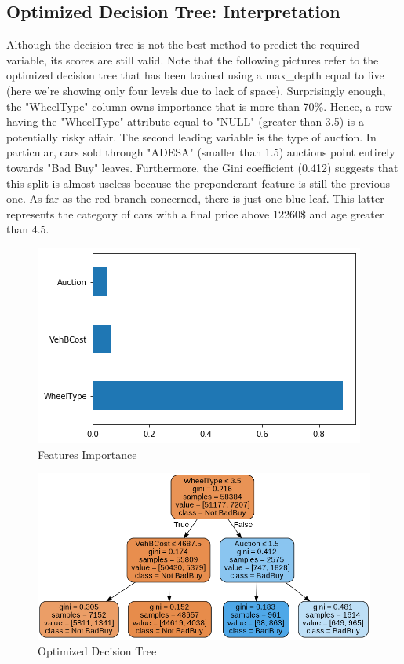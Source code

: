 \documentclass{article}
\begin{document}
	\subsection{Optimized Decision Tree: Interpretation}
	Although the decision tree is not the best method to predict the required variable, its scores are still valid. Note that the following pictures refer to the optimized decision tree that has been trained using a max\_depth equal to five (here we're showing only four levels due to lack of space). Surprisingly enough, the "WheelType" column owns importance that is more than 70\%. Hence, a row having the "WheelType" attribute equal to "NULL" (greater than 3.5) is a potentially risky affair. The second leading variable is the type of auction. In particular, cars sold through "ADESA" (smaller than 1.5) auctions point entirely towards "Bad Buy" leaves. Furthermore, the Gini coefficient (0.412) suggests that this split is almost useless because the preponderant feature is still the previous one. As far as the red branch concerned, there is just one blue leaf. This latter represents the category of cars with a final price above 12260\$ and age greater than 4.5.
	
	\begin{figure}[H]
		\centering
		\includegraphics[width=.4\textwidth]{dectreevar.png}
		\caption{Features Importance}
		\label{fig:optdectreefeat}
	\end{figure}
	
	\begin{figure}[H]
		\centering
		\includegraphics[height=.95\textheight]{dectree.png}
		\caption{Optimized Decision Tree}
		\label{fig:optdectree}
	\end{figure}
	
\end{document}
